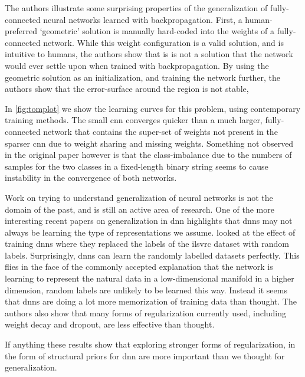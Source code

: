 \documentclass[thesis]{subfiles}
\begin{document}
	The authors illustrate some surprising properties of the generalization of fully-connected neural networks learned with backpropagation. First, a human-preferred `geometric' solution is manually hard-coded into the weights of a fully-connected network. While this weight configuration is a valid solution, and is intuitive to humans, the authors show that is is not a solution that the network would ever settle upon when trained with backpropagation. By using the geometric solution as an initialization, and training the network further, the authors show that the error-surface around the region is not stable,

	In \cref{fig:tomplot} we show the learning curves for this problem, using contemporary training methods. The small \gls{cnn} converges quicker than a much larger, fully-connected network that contains the super-set of weights not present in the sparser \gls{cnn} due to weight sharing and missing weights. Something not observed in the original paper however is that the class-imbalance due to the numbers of samples for the two classes in a fixed-length binary string seems to cause instability in the convergence of both networks.

	Work on trying to understand generalization of neural networks is not the domain of the past, and is still an active area of research. One of the more interesting recent papers on generalization in \gls{dnn} highlights that \glspl{dnn} may not always be learning the type of representations we assume.  looked at the effect of training \glspl{dnn} where they replaced the labels of the \gls{ilsvrc} dataset with random labels. Surprisingly, \glspl{dnn} can learn the randomly labelled datasets perfectly. This flies in the face of the commonly accepted explanation that the network is learning to represent the natural data in a low-dimensional manifold in a higher dimension, random labels are unlikely to be learned this way. Instead it seems that \glspl{dnn} are doing a lot more memorization of training data than thought. The authors also show that many forms of regularization currently used, including weight decay and dropout, are less effective than thought.

	If anything these results show that exploring stronger forms of regularization, in the form of structural priors for \gls{dnn} are more important than we thought for generalization.
\end{document}
